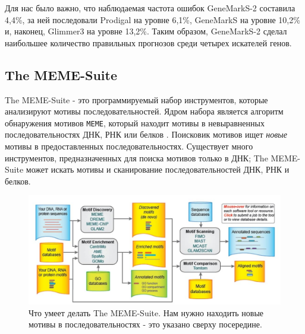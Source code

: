 \documentclass[14pt]{extarticle}
\begin{document}
    
    \par{Для нас было важно, что наблюдаемая частота ошибок GeneMarkS-2 составила 4,4\%, за ней последовали Prodigal на 
    уровне 6,1\%, GeneMarkS на уровне 10,2\% и, наконец, Glimmer3 на уровне 13,2\%. Таким образом, GeneMarkS-2 сделал 
    наибольшее количество правильных прогнозов среди четырех искателей генов. \cite{lomsad}}
    
    \begin{center}
        \item \subsection{The MEME-Suite}
    \end{center}
    
    \par{The MEME-Suite - это программируемый набор инструментов, которые анализируют мотивы последовательностей. Ядром 
    набора является алгоритм обнаружения мотивов \texttt{MEME}, который находит мотивы в невыравненных 
    последовательностях ДНК, РНК или белков \cite{_1}. Поисковик мотивов ищет \textit{новые} мотивы в предоставленных 
    последовательностях. Существует много инструментов, предназначенных для поиска мотивов только в ДНК; The MEME-Suite 
    может искать мотивы и сканирование последовательностей ДНК, РНК и белков. \cite{bailey}}
    
    \begin{figure}[]
        \centering
        \includegraphics[width=\textwidth]{img/meme.jpg}
        \caption{Что умеет делать The MEME-Suite. Нам нужно находить новые мотивы в последовательностях - это 
        указано сверху посередине. \cite{bailey}}
        \label{fig:skybox}
    \end{figure}
    
\end{document}
